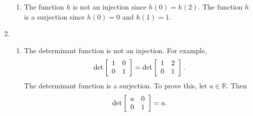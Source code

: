 \begin{enumerate}
\begin{enumerate}
\item The function $h$ is not an injection since $h(0) = h(2)$.  The function $h$ is a surjection since $h(0) = 0$ and $h(1) = 1$.
\end{enumerate}


\item \begin{enumerate}
\item The determinant function is not an injection.  For example,
\[
\det \left[ {\begin{array}{*{20}c}
   1 & 0  \\
   0 & 1  \\
\end{array} } \right] =  \det \left[ {\begin{array}{*{20}c}
   1 & 2  \\
   0 & 1  \\
 \end{array} } \right].
\]
The determinant function is a surjection.  To prove this, let $a \in \mathbb{R}$.  Then
\[
\det \left[ {\begin{array}{*{20}c}
   a & 0  \\
   0 & 1  \\
\end{array} } \right] =  a.
\]


\end{enumerate}
\end{enumerate}
